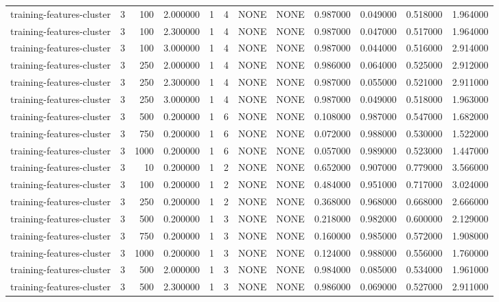 \begin{tabular}{lrrrllllrrrr}
training-features-cluster & 3 & 100 & 2.000000 & 1 & 4 & NONE & NONE & 0.987000 & 0.049000 & 0.518000 & 1.964000 \\
training-features-cluster & 3 & 100 & 2.300000 & 1 & 4 & NONE & NONE & 0.987000 & 0.047000 & 0.517000 & 1.964000 \\
training-features-cluster & 3 & 100 & 3.000000 & 1 & 4 & NONE & NONE & 0.987000 & 0.044000 & 0.516000 & 2.914000 \\
training-features-cluster & 3 & 250 & 2.000000 & 1 & 4 & NONE & NONE & 0.986000 & 0.064000 & 0.525000 & 2.912000 \\
training-features-cluster & 3 & 250 & 2.300000 & 1 & 4 & NONE & NONE & 0.987000 & 0.055000 & 0.521000 & 2.911000 \\
training-features-cluster & 3 & 250 & 3.000000 & 1 & 4 & NONE & NONE & 0.987000 & 0.049000 & 0.518000 & 1.963000 \\
training-features-cluster & 3 & 500 & 0.200000 & 1 & 6 & NONE & NONE & 0.108000 & 0.987000 & 0.547000 & 1.682000 \\
training-features-cluster & 3 & 750 & 0.200000 & 1 & 6 & NONE & NONE & 0.072000 & 0.988000 & 0.530000 & 1.522000 \\
training-features-cluster & 3 & 1000 & 0.200000 & 1 & 6 & NONE & NONE & 0.057000 & 0.989000 & 0.523000 & 1.447000 \\
training-features-cluster & 3 & 10 & 0.200000 & 1 & 2 & NONE & NONE & 0.652000 & 0.907000 & 0.779000 & 3.566000 \\
training-features-cluster & 3 & 100 & 0.200000 & 1 & 2 & NONE & NONE & 0.484000 & 0.951000 & 0.717000 & 3.024000 \\
training-features-cluster & 3 & 250 & 0.200000 & 1 & 2 & NONE & NONE & 0.368000 & 0.968000 & 0.668000 & 2.666000 \\
training-features-cluster & 3 & 500 & 0.200000 & 1 & 3 & NONE & NONE & 0.218000 & 0.982000 & 0.600000 & 2.129000 \\
training-features-cluster & 3 & 750 & 0.200000 & 1 & 3 & NONE & NONE & 0.160000 & 0.985000 & 0.572000 & 1.908000 \\
training-features-cluster & 3 & 1000 & 0.200000 & 1 & 3 & NONE & NONE & 0.124000 & 0.988000 & 0.556000 & 1.760000 \\
training-features-cluster & 3 & 500 & 2.000000 & 1 & 3 & NONE & NONE & 0.984000 & 0.085000 & 0.534000 & 1.961000 \\
training-features-cluster & 3 & 500 & 2.300000 & 1 & 3 & NONE & NONE & 0.986000 & 0.069000 & 0.527000 & 2.911000 \\

\end{tabular}
